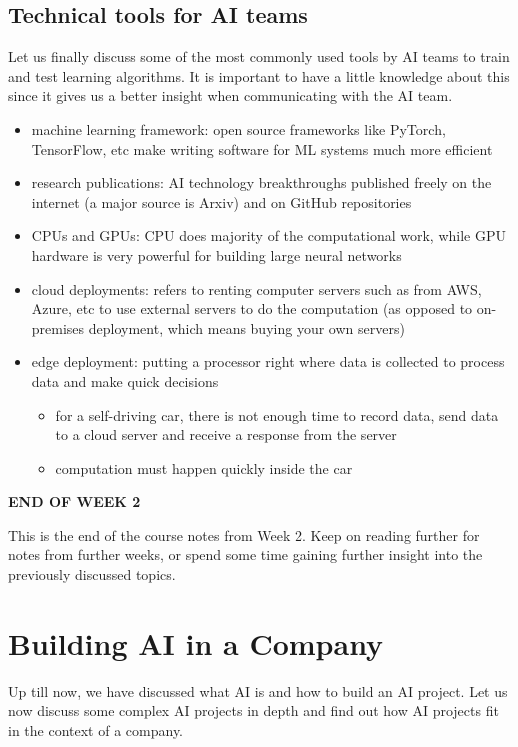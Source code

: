 \documentclass{article}[a4paper,12pt]
\theoremstyle{definition}
\begin{document}
\subsection{Technical tools for AI teams}
Let us finally discuss some of the most commonly used tools by AI teams to train and test learning algorithms. It is important to have a little knowledge about this since it gives us a better insight when communicating with the AI team.
\begin{itemize}
	\item machine learning framework: open source frameworks like PyTorch, TensorFlow, etc make writing software for ML systems much more efficient
	\item research publications: AI technology breakthroughs published freely on the internet (a major source is Arxiv) and on GitHub repositories
	\item CPUs and GPUs: CPU does majority of the computational work, while GPU hardware is very powerful for building large neural networks
	\item cloud deployments: refers to renting computer servers such as from AWS, Azure, etc to use external servers to do the computation (as opposed to on-premises deployment, which means buying your own servers)
	\item edge deployment: putting a processor right where data is collected to process data and make quick decisions
	\begin{itemize}
		\item for a self-driving car, there is not enough time to record data, send data to a cloud server and receive a response from the server
		\item computation must happen quickly inside the car
	\end{itemize}
\end{itemize}
\hrulefill
\begin{center}
\textbf{END OF WEEK 2}
\end{center}
This is the end of the course notes from Week 2. Keep on reading further for notes from further weeks, or spend some time gaining further insight into the previously discussed topics.

\hrulefill
\pagebreak
\section{Building AI in a Company}
Up till now, we have discussed what AI is and how to build an AI project. Let us now discuss some complex AI projects in depth and find out how AI projects fit in the context of a company.
\end{document}
